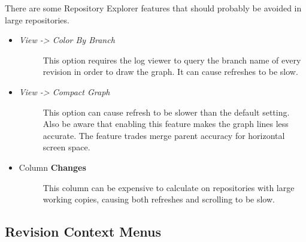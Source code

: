 \documentclass[letterpaper,10pt,english]{manual}
\begin{document}
There are some Repository Explorer features that should probably be
avoided in large repositories.
\begin{itemize}
\item {} \begin{description}
\item[\emph{View -\textgreater{} Color By Branch}]
This option requires the log viewer to query the branch name of
every revision in order to draw the graph.  It can cause refreshes
to be slow.

\end{description}

\item {} \begin{description}
\item[\emph{View -\textgreater{} Compact Graph}]
This option can cause refresh to be slower than the default setting.
Also be aware that enabling this feature makes the graph lines less
accurate.  The feature trades merge parent accuracy for horizontal
screen space.

\end{description}

\item {} \begin{description}
\item[Column \textbf{Changes}]
This column can be expensive to calculate on repositories with large
working copies, causing both refreshes and scrolling to be slow.

\end{description}

\end{itemize}


\subsection{Revision Context Menus}
\end{document}
